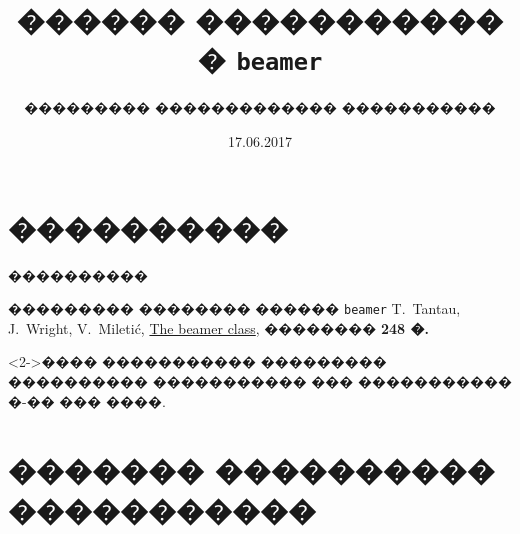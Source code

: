 \documentclass[fullscreen=true,russian,compress,%
	hyperref={unicode,bookmarks=false}]{presentation}
\begin{document}

\title[����������� � \texttt{beamer}]{������ ����������� � \texttt{beamer}}
\author{��������� ������������� �����������}
\date{17.06.2017}

\begin{frame}
\titlepage
\end{frame}


\section{����������}

\begin{frame}{����������}

\begin{block}{��������� �������� ������ \texttt{beamer}}
T.~Tantau, J.~Wright, V.~Mileti\'c,
\href{https://www.ctan.org/tex-archive/macros/latex/contrib/beamer}{The beamer class}, �������� \textbf{248 �.}
\end{block}	

\begin{block}<2->{���� �����������}
	��������� ���������� ����������� ��� ����������� �-�� ��� ����.
\end{block}	

\end{frame}


\section{������� ���������� �����������}
\end{document}
